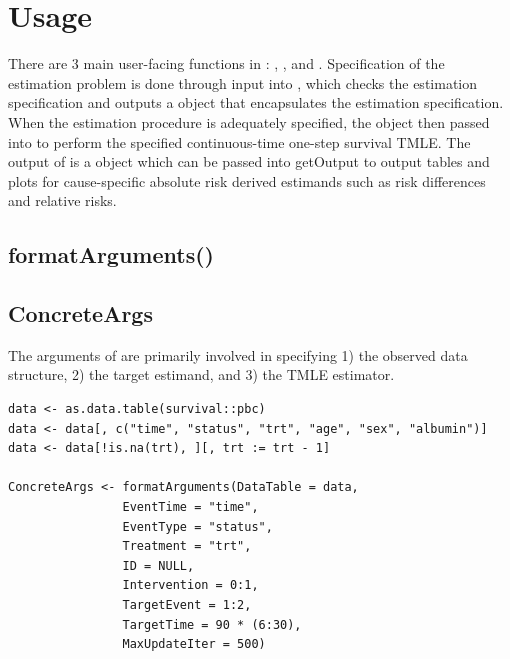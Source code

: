 \documentclass{report}
\newcommand{\1}{\ensuremath{\mathbf{1}}}
\begin{document}
\section{Usage}
\label{UsingConcrete}
There are 3 main user-facing functions in : , , and . Specification of the estimation problem is done through input into , which checks the estimation specification and outputs a  object that encapsulates the estimation specification. When the estimation procedure is adequately specified, the  object then passed into  to perform the specified continuous-time one-step survival TMLE. The output of  is a  object which can be passed into getOutput to output tables and plots for cause-specific absolute risk derived estimands such as risk differences and relative risks. 

\subsection{formatArguments()}
\label{formatArguments}

\subsection{ConcreteArgs}
\label{sec:org709211d}
The arguments of  are primarily involved in specifying 1) the observed data structure, 2) the target estimand, and 3) the TMLE estimator.

\begin{lstlisting}
data <- as.data.table(survival::pbc)
data <- data[, c("time", "status", "trt", "age", "sex", "albumin")]
data <- data[!is.na(trt), ][, trt := trt - 1]

ConcreteArgs <- formatArguments(DataTable = data,
				EventTime = "time",
				EventType = "status",
				Treatment = "trt",
				ID = NULL, 
				Intervention = 0:1,
				TargetEvent = 1:2,
				TargetTime = 90 * (6:30),
				MaxUpdateIter = 500)
\end{lstlisting}
\end{document}
